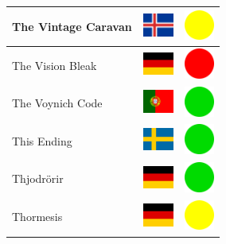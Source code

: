 \documentclass[12pt, a4paper, twoside]{report}
\begin{document}
\begin{center}
\begin{longtable}{|p{5cm}|p{2cm}|p{2cm}|}
 The Vintage Caravan                                        & \includegraphics[width=1cm]{../4x3/is} &   \includegraphics[width=1cm]{../likes/m} \\ \hline
 The Vision Bleak                                           & \includegraphics[width=1cm]{../4x3/de} &   \includegraphics[width=1cm]{../likes/n} \\ \hline
 The Voynich Code                                           & \includegraphics[width=1cm]{../4x3/pt} &   \includegraphics[width=1cm]{../likes/y} \\ \hline
 This Ending                                                & \includegraphics[width=1cm]{../4x3/se} &   \includegraphics[width=1cm]{../likes/y} \\ \hline
 Thjodrörir                                                 & \includegraphics[width=1cm]{../4x3/de} &   \includegraphics[width=1cm]{../likes/y} \\ \hline
 Thormesis                                                  & \includegraphics[width=1cm]{../4x3/de} &   \includegraphics[width=1cm]{../likes/m} \\ \hline

\end{longtable}
\end{center}
\end{document}
